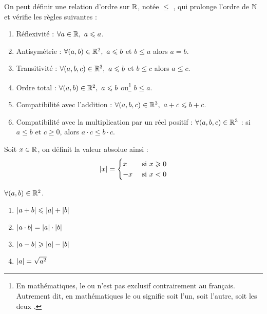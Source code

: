 \begin{proposition}
    On peut définir une relation d'ordre sur $\mathbb{R}$, notée \og $\leq$ \fg, qui prolonge l'ordre de $\mathbb{N}$ et vérifie les règles suivantes :
    \begin{enumerate}
        \item Réflexivité : $\forall a \in \mathbb{R},\ a \leqslant a$.
        \item Antisymétrie : $\forall (a, b) \in \mathbb{R}^2,\ a \leqslant b$ et $b \leq a$ alors $a = b$.
        \item Transitivité : $\forall (a, b, c) \in \mathbb{R}^3,\ a \leqslant b$ et $b \leq c$ alors $a \leq c$.
        \item Ordre total : $\forall (a, b) \in \mathbb{R}^2,\ a \leqslant b$ ou\footnote{En mathématiques, le \og ou \fg n'est pas exclusif contrairement au français. Autrement dit, en mathématiques le \og ou \fg signifie \og soit l'un, soit l'autre, soit les deux \fg.} $b \leq a$.
        \item Compatibilité avec l'addition : $\forall (a, b, c) \in \mathbb{R}^3,\ a + c \leqslant b + c$.
        \item Compatibilité avec la multiplication par un réel positif : $\forall (a, b, c) \in \mathbb{R}^3$ : si $a \leq b$ et $c \geq 0$, alors $a \cdot c \leq b \cdot c$.
    \end{enumerate}
\end{proposition}

\begin{definition}
    Soit $x \in \mathbb{R}$, on définit la valeur absolue ainsi :
    \begin{align*}
        \abs{x} =
        \begin{cases}
            x &\text{ si } x \geqslant 0 \\
            -x &\text{ si } x < 0
        \end{cases}
    \end{align*}
\end{definition}

\begin{proposition}
    $\forall (a, b) \in \mathbb{R}^2$.
    \begin{multicols}{2}
        \begin{enumerate}
            \item $\abs{a + b} \leqslant \abs{a} + \abs{b}$
            \item $\abs{a \cdot b} = \abs{a} \cdot \abs{b}$
            \item $\abs{a - b} \geqslant \abs{a} - \abs{b}$
            \item $\abs{a} = \sqrt{a^2}$
        \end{enumerate}
    \end{multicols}
\end{proposition}

